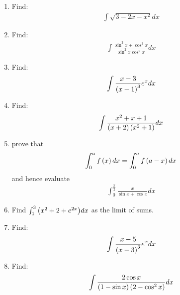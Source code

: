 \begin{enumerate}
\item Find: \begin{align*}\int\sqrt{3-2x-x^2}dx\end{align*}

\item Find: \begin{align*}\int{\frac{\sin^3{x}+\cos^3{x}}{\sin^2{x}\cos^2{x}}}dx\end{align*}

\item Find: \begin{align*}\int{\frac{x-3}{\ensuremath{\left(x-1\right)}^3}}e^x 
dx\end{align*}

\item Find: \begin{align*}\int{\frac{x^2+x+1}{\ensuremath{\left(x+2\right)}\ensuremath{\left(x^2+1\right)}}}dx\end{align*}

\item prove that 
\begin{align*}
    \int_{0}^{a} f\left(x\right)dx = \int_{0}^{a} f\left(a-x\right)dx
\end{align*}
and hence evaluate 
\begin{align*}
\int_{0}^{\frac{\pi}{2}}\frac{x}{{\sin x}+{\cos x}}dx
\end{align*}

\item Find $\int_{1}^{3}{\left(x^2+2+e^{2x}\right)}dx$ as the limit of sums.
        

         \item Find: 
 \begin{align*}
 \int{\frac{x-5}{\ensuremath{\left(x-3\right)}^3}}e^x dx
 \end{align*}

\item Find: 
\begin{align*}
\int{\frac{2\cos x}{\ensuremath{\left(1-\sin x\right)}\ensuremath{\left(2-\cos^2 x\right)}}}dx
\end{align*}  
\end{enumerate} 
